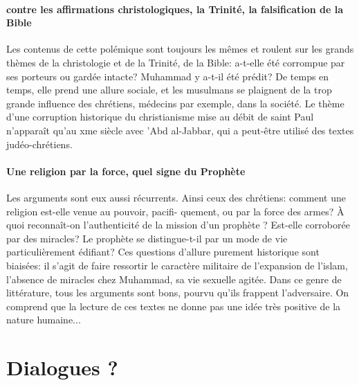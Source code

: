 \paragraph{contre les affirmations christologiques, la Trinité, la falsification de la Bible}
Les contenus de cette polémique sont toujours les mêmes et roulent sur les grands thèmes de la christologie et de la Trinité, de la Bible: a-t-elle été corrompue par ses porteurs ou gardée intacte? Muhammad y a-t-il été prédit? De temps en temps, elle prend une allure sociale, et les musulmans se plaignent de la trop grande influence des chrétiens, médecins par exemple, dans la société. Le thème d'une corruption historique du christianisme mise au débit de saint Paul n'apparaît qu'au xme siècle avec 'Abd al-Jabbar, qui a peut-être utilisé des textes judéo-chrétiens.

\paragraph{Une religion par la force, quel signe du Prophète}
Les arguments sont eux aussi récurrents. Ainsi ceux des chrétiens: comment une religion est-elle venue au pouvoir, pacifi-
quement, ou par la force des armes? À quoi reconnaît-on l'authenticité de la mission d'un prophète ? Est-elle corroborée par des miracles? Le prophète se distingue-t-il par un mode de vie particulièrement édifiant? Ces questions d'allure purement historique sont biaisées: il s'agit de faire ressortir le caractère militaire de l'expansion de l'islam, l'absence de miracles chez Muhammad, sa vie sexuelle agitée. Dans ce genre de littérature, tous les arguments sont bons, pourvu qu'ils frappent l'adversaire. On comprend que la lecture de ces textes ne donne pas une idée très positive de la nature humaine...

\section{Dialogues ?}

